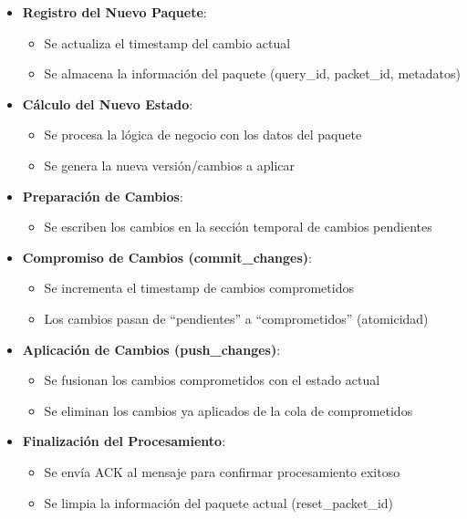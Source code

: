 \begin{itemize}
  \item \textbf{Registro del Nuevo Paquete}:
    \begin{itemize}
      \item Se actualiza el timestamp del cambio actual
      \item Se almacena la información del paquete (query\_id, packet\_id, metadatos)
    \end{itemize}

  \item \textbf{Cálculo del Nuevo Estado}:
    \begin{itemize}
      \item Se procesa la lógica de negocio con los datos del paquete
      \item Se genera la nueva versión/cambios a aplicar
    \end{itemize}

  \item \textbf{Preparación de Cambios}:
    \begin{itemize}
      \item Se escriben los cambios en la sección temporal de cambios pendientes
    \end{itemize}

  \item \textbf{Compromiso de Cambios (commit\_changes)}:
    \begin{itemize}
      \item Se incrementa el timestamp de cambios comprometidos
      \item Los cambios pasan de ``pendientes'' a ``comprometidos'' (atomicidad)
    \end{itemize}

  \item \textbf{Aplicación de Cambios (push\_changes)}:
    \begin{itemize}
      \item Se fusionan los cambios comprometidos con el estado actual
      \item Se eliminan los cambios ya aplicados de la cola de comprometidos
    \end{itemize}

  \item \textbf{Finalización del Procesamiento}:
    \begin{itemize}
      \item Se envía ACK al mensaje para confirmar procesamiento exitoso
      \item Se limpia la información del paquete actual (reset\_packet\_id)
    \end{itemize}
\end{itemize}


